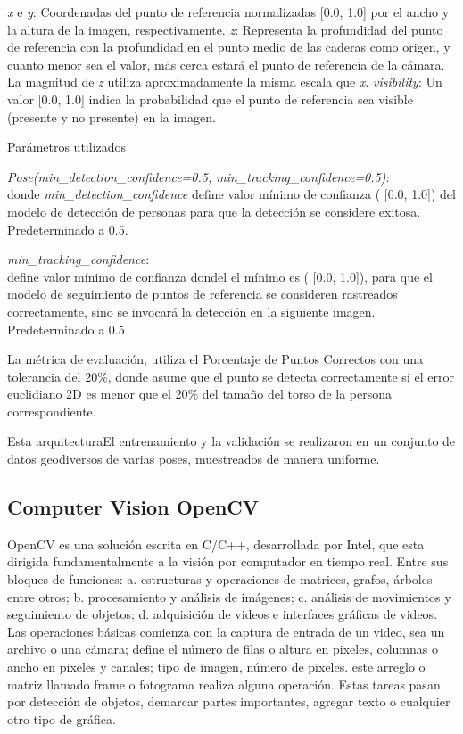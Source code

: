\documentclass[twoside,11pt]{article}
\begin{document}
 \textit{x} e \textit{y}: Coordenadas del punto de referencia 
 normalizadas [0.0, 1.0] por el ancho y la altura de la imagen, 
 respectivamente.
 \textit{z}: Representa la profundidad del punto de referencia 
 con la profundidad en el punto medio de las caderas como origen, 
 y cuanto menor sea el valor, más cerca estará el punto de referencia 
 de la cámara. La magnitud de \textit{z} utiliza aproximadamente 
 la misma escala que \textit{x}.
 \textit{visibility}: Un valor [0.0, 1.0] indica la probabilidad 
 que el punto de referencia sea visible (presente y no presente) en 
 la imagen.

Parámetros utilizados

\textit{Pose(min\_detection\_confidence=0.5, min\_tracking\_confidence=0.5)}:\\
donde \textit{min\_detection\_confidence} define valor mínimo de 
confianza ( [0.0, 1.0]) del modelo de detección de personas para 
que la detección se considere exitosa. Predeterminado a 0.5. 

\textit{min\_tracking\_confidence}:\\ define valor mínimo de confianza 
 dondel el mínimo es ( [0.0, 1.0]), para que el modelo de seguimiento 
 de puntos de referencia se consideren rastreados correctamente, sino 
 se invocará la detección en la siguiente imagen. Predeterminado a 0.5

 La métrica de evaluación, utiliza el Porcentaje de Puntos Correctos con 
una tolerancia del 20\%, donde asume que el punto se detecta correctamente
 si el error euclidiano 2D es menor que el 20\% del tamaño del torso de 
 la persona correspondiente. 
 
 Esta arquitecturaEl entrenamiento y la validación se realizaron en un conjunto de datos 
 geodiversos de varias poses, muestreados de manera uniforme.

\subsection{Computer Vision OpenCV}
OpenCV es una solución escrita en C/C++, desarrollada por Intel, que esta dirigida 
fundamentalmente a la visión por computador en tiempo real. Entre sus bloques de 
funciones: a. estructuras y operaciones de matrices, grafos, árboles entre otros; 
b. procesamiento y análisis de imágenes; c. análisis de movimientos y seguimiento de objetos; 
d. adquisición de videos e interfaces gráficas de videos. Las operaciones básicas comienza 
con la captura de entrada de un video, sea un archivo o una cámara; define el número de filas 
o altura en pixeles, columnas o ancho en pixeles y canales; tipo de imagen, número de pixeles. 
este arreglo o matriz llamado frame o fotograma realiza alguna operación. Estas tareas pasan 
por detección de objetos, demarcar partes importantes, agregar texto o cualquier otro tipo de gráfica.
\end{document}
